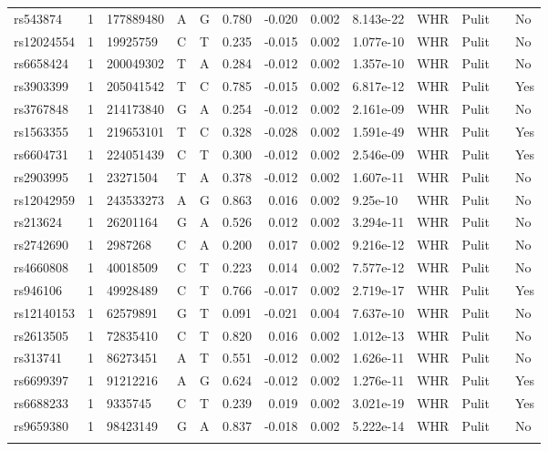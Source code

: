 \documentclass[11pt,twoside]{bristolthesis}
\begin{document}
\begin{longtable}[t]{lrlllrrrlllll}
rs543874 & 1 & 177889480 & A & G & 0.780 & -0.020 & 0.002 & 8.143e-22 & WHR & Pulit &  & No\\
rs12024554 & 1 & 19925759 & C & T & 0.235 & -0.015 & 0.002 & 1.077e-10 & WHR & Pulit &  & No\\
rs6658424 & 1 & 200049302 & T & A & 0.284 & -0.012 & 0.002 & 1.357e-10 & WHR & Pulit &  & No\\
rs3903399 & 1 & 205041542 & T & C & 0.785 & -0.015 & 0.002 & 6.817e-12 & WHR & Pulit &  & Yes\\
\addlinespace
rs3767848 & 1 & 214173840 & G & A & 0.254 & -0.012 & 0.002 & 2.161e-09 & WHR & Pulit &  & No\\
rs1563355 & 1 & 219653101 & T & C & 0.328 & -0.028 & 0.002 & 1.591e-49 & WHR & Pulit &  & Yes\\
rs6604731 & 1 & 224051439 & C & T & 0.300 & -0.012 & 0.002 & 2.546e-09 & WHR & Pulit &  & Yes\\
rs2903995 & 1 & 23271504 & T & A & 0.378 & -0.012 & 0.002 & 1.607e-11 & WHR & Pulit &  & No\\
rs12042959 & 1 & 243533273 & A & G & 0.863 & 0.016 & 0.002 & 9.25e-10 & WHR & Pulit &  & No\\
\addlinespace
rs213624 & 1 & 26201164 & G & A & 0.526 & 0.012 & 0.002 & 3.294e-11 & WHR & Pulit &  & No\\
rs2742690 & 1 & 2987268 & C & A & 0.200 & 0.017 & 0.002 & 9.216e-12 & WHR & Pulit &  & No\\
rs4660808 & 1 & 40018509 & C & T & 0.223 & 0.014 & 0.002 & 7.577e-12 & WHR & Pulit &  & No\\
rs946106 & 1 & 49928489 & C & T & 0.766 & -0.017 & 0.002 & 2.719e-17 & WHR & Pulit &  & Yes\\
rs12140153 & 1 & 62579891 & G & T & 0.091 & -0.021 & 0.004 & 7.637e-10 & WHR & Pulit &  & No\\
\addlinespace
rs2613505 & 1 & 72835410 & C & T & 0.820 & 0.016 & 0.002 & 1.012e-13 & WHR & Pulit &  & No\\
rs313741 & 1 & 86273451 & A & T & 0.551 & -0.012 & 0.002 & 1.626e-11 & WHR & Pulit &  & No\\
rs6699397 & 1 & 91212216 & A & G & 0.624 & -0.012 & 0.002 & 1.276e-11 & WHR & Pulit &  & Yes\\
rs6688233 & 1 & 9335745 & C & T & 0.239 & 0.019 & 0.002 & 3.021e-19 & WHR & Pulit &  & Yes\\
rs9659380 & 1 & 98423149 & G & A & 0.837 & -0.018 & 0.002 & 5.222e-14 & WHR & Pulit &  & No\\
\addlinespace

\end{longtable}
\end{document}
